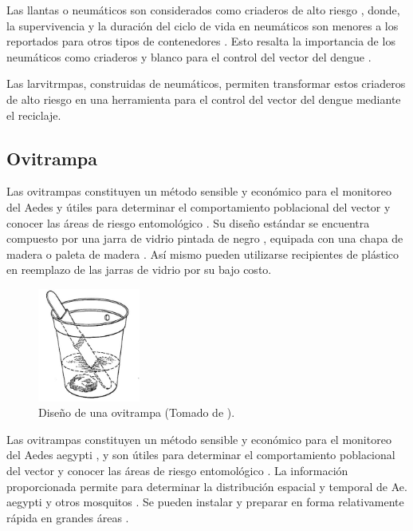 Las llantas o neumáticos son considerados como criaderos de alto riesgo
\cite{bisset2008distribucion, manrique1998desarrollo}, donde, la supervivencia y la duración del
ciclo de vida en neumáticos son menores a los reportados para otros tipos de contenedores
\cite{manrique1998desarrollo}. Esto resalta la importancia de los neumáticos como criaderos y
blanco para el control del vector del dengue \cite{manrique1998desarrollo}.

Las larvitrmpas, construidas de neumáticos, permiten transformar estos criaderos de alto
riesgo en una herramienta para el control del vector del dengue mediante el reciclaje.

\subsection{Ovitrampa}
\label{sec:densidad-vectorial-ovitrampa}
Las ovitrampas constituyen un método sensible y económico para el monitoreo del Aedes y útiles
para determinar el comportamiento poblacional del vector y conocer las áreas de riesgo
entomológico \cite{cenaprece2013}. Su diseño estándar se encuentra compuesto por una jarra de
vidrio pintada de negro \cite{dengueUruguayCap1, world2009dengue}, equipada con una chapa de
madera o paleta de madera \cite{dengueUruguayCap1, world2009dengue, website:TimothyOvitrap2014,
manualControlArg2009}. Así mismo pueden utilizarse recipientes de plástico
\cite{website:TimothyOvitrap2014, cenaprece2013, manualControlArg2009, MARQUES1993} en reemplazo
de las jarras de vidrio por su bajo costo.


\begin{figure}[H]
\centering
\includegraphics[width=0.3\textwidth]{capitulo-3/graphics/ovitrampa.jpg}
\caption{\label{fig:cap3-larvitrampas} Diseño de una ovitrampa (Tomado de
\cite{website:TimothyOvitrap2014}).}
\end{figure}

Las ovitrampas constituyen un método sensible y económico para el monitoreo del Aedes aegypti
\cite{cenaprece2013, world2009dengue}, y son útiles para determinar el comportamiento poblacional
del vector y conocer las áreas de riesgo entomológico \cite{cenaprece2013}. La información
proporcionada permite para determinar la distribución espacial y temporal de Ae. aegypti y otros
mosquitos \cite{dengueUruguayCap1}. Se pueden instalar y preparar en forma relativamente rápida en
grandes áreas \cite{world2009dengue}.


